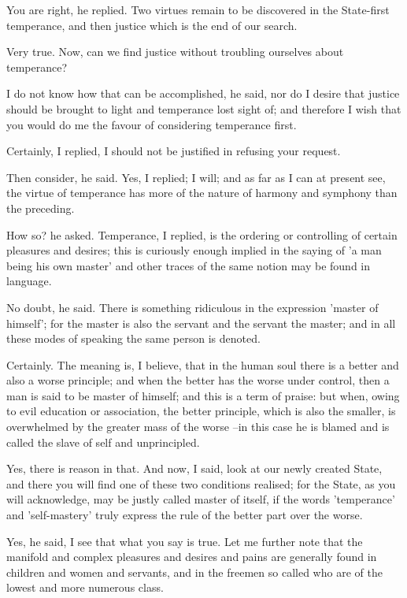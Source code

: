 You are right, he replied.
Two virtues remain to be discovered in the State-first temperance, and then justice which is the end of our search.

Very true.
Now, can we find justice without troubling ourselves about temperance?

I do not know how that can be accomplished, he said, nor do I desire that justice should be brought to light and temperance lost sight of; and therefore I wish that you would do me the favour of considering temperance first.

Certainly, I replied, I should not be justified in refusing your request.

Then consider, he said.
Yes, I replied; I will; and as far as I can at present see, the virtue of temperance has more of the nature of harmony and symphony than the preceding.

How so? he asked.
Temperance, I replied, is the ordering or controlling of certain pleasures and desires; this is curiously enough implied in the saying of 'a man being his own master' and other traces of the same notion may be found in language.

No doubt, he said.
There is something ridiculous in the expression 'master of himself'; for the master is also the servant and the servant the master; and in all these modes of speaking the same person is denoted.

Certainly.
The meaning is, I believe, that in the human soul there is a better and also a worse principle; and when the better has the worse under control, then a man is said to be master of himself; and this is a term of praise: but when, owing to evil education or association, the better principle, which is also the smaller, is overwhelmed by the greater mass of the worse --in this case he is blamed and is called the slave of self and unprincipled.

Yes, there is reason in that.
And now, I said, look at our newly created State, and there you will find one of these two conditions realised; for the State, as you will acknowledge, may be justly called master of itself, if the words 'temperance' and 'self-mastery' truly express the rule of the better part over the worse.

Yes, he said, I see that what you say is true.
Let me further note that the manifold and complex pleasures and desires and pains are generally found in children and women and servants, and in the freemen so called who are of the lowest and more numerous class.

